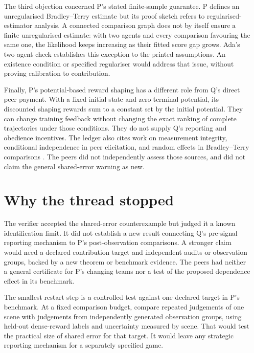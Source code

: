 \documentclass{article}
\begin{document}
The third objection concerned P's stated finite-sample guarantee. P defines an unregularised
Bradley--Terry estimate but its proof sketch refers to regularised-estimator analysis. A connected
comparison graph does not by itself ensure a finite unregularised estimate: with two agents and
every comparison favouring the same one, the likelihood keeps increasing as their fitted score gap
grows. Ada's two-agent check establishes this exception to the printed assumptions. An existence
condition or specified regulariser would address that issue, without proving calibration to
contribution.

Finally, P's potential-based reward shaping has a different role from Q's direct peer payment. With
a fixed initial state and zero terminal potential, its discounted shaping rewards sum to a constant
set by the initial potential. They can change training feedback without changing the exact ranking
of complete trajectories under those conditions. They do not supply Q's reporting and obedience
incentives. The ledger also cites work on measurement integrity, conditional independence in peer
elicitation, and random effects in Bradley--Terry comparisons \cite{integrity,independence,random}.
The peers did not independently assess those sources, and did not claim the general shared-error
warning as new.

\section{Why the thread stopped}

The verifier accepted the shared-error counterexample but judged it a known identification limit. It
did not establish a new result connecting Q's pre-signal reporting mechanism to P's post-observation
comparisons. A stronger claim would need a declared contribution target and independent audits or
observation groups, backed by a new theorem or benchmark evidence. The peers had neither a general
certificate for P's changing teams nor a test of the proposed dependence effect in its benchmark.

The smallest restart step is a controlled test against one declared target in P's benchmark. At a
fixed comparison budget, compare repeated judgements of one scene with judgements from independently
generated observation groups, using held-out dense-reward labels and uncertainty measured by scene.
That would test the practical size of shared error for that target. It would leave any strategic
reporting mechanism for a separately specified game.



\end{document}
